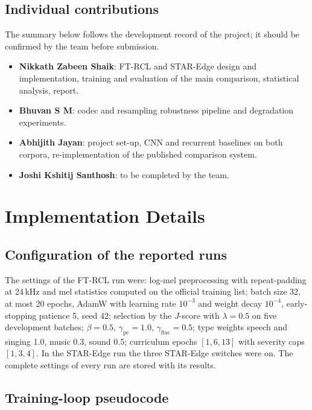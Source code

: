 \documentclass[12pt,a4paper]{report}
\begin{document}
\section*{Individual contributions}

The summary below follows the development record of the project; it should be confirmed by the team before submission.

\begin{itemize}
  \item \textbf{Nikkath Zabeen Shaik}: FT-RCL and STAR-Edge design and implementation, training and evaluation of the main comparison, statistical analysis, report.
  \item \textbf{Bhuvan S M}: codec and resampling robustness pipeline and degradation experiments.
  \item \textbf{Abhijith Jayan}: project set-up, CNN and recurrent baselines on both corpora, re-implementation of the published comparison system.
  \item \textbf{Joshi Kshitij Santhosh}: to be completed by the team.
\end{itemize}


\appendix
\chapter{Implementation Details}
\label{app:details}

\section{Configuration of the reported runs}
\label{app:config}

The settings of the FT-RCL run were: log-mel preprocessing with repeat-padding at 24\,kHz and mel statistics computed on the official training list; batch size 32, at most 20 epochs, AdamW with learning rate $10^{-3}$ and weight decay $10^{-4}$, early-stopping patience 5, seed 42; selection by the $J$-score with $\lambda=0.5$ on five development batches; $\beta=0.5$, $\gamma_{\mathrm{pc}}=1.0$, $\gamma_{\mathrm{ftsc}}=0.5$; type weights speech and singing 1.0, music 0.3, sound 0.5; curriculum epochs $[1,6,13]$ with severity caps $[1,3,4]$. In the STAR-Edge run the three STAR-Edge switches were on. The complete settings of every run are stored with its results.

\section{Training-loop pseudocode}
\label{app:pseudo}
\end{document}
